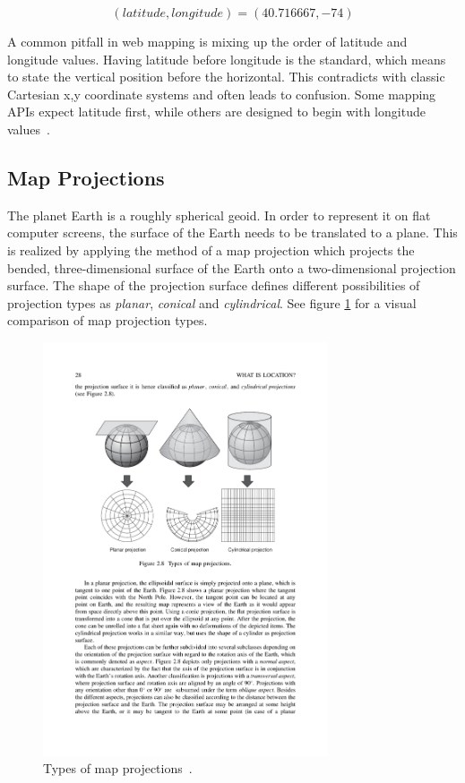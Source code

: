 \begin{itemize}
  \[ (latitude, longitude) = (40.716667, -74) \]

A common pitfall in web mapping is mixing up the order of latitude and longitude values. Having latitude before longitude is the standard, which means to state the vertical position before the horizontal. This contradicts with classic Cartesian x,y coordinate systems and often leads to confusion. Some mapping APIs expect latitude first, while others are designed to begin with longitude values~\cite{Kupper2005lbs, Zzolo11mappingdrupal}. 

\end{itemize}




\subsection{Map Projections}

The planet Earth is a roughly spherical geoid. In order to represent it on flat computer screens, the surface of the Earth needs to be translated to a plane. This is realized by applying the method of a map projection which projects the bended, three-dimensional surface of the Earth onto a two-dimensional projection surface. The shape of the projection surface defines different possibilities of projection types as \textit{planar}, \textit{conical} and \textit{cylindrical}. See figure \ref{fig:map-projection-types} for a visual comparison of map projection types.

\begin{figure}[h]
  \begin{center}
    \includegraphics[width=0.75\textwidth]{figures/map_projection_types}
    \caption{Types of map projections~\cite[p 28]{Kupper2005lbs}.}
    \label{fig:map-projection-types}
  \end{center}
\end{figure}


